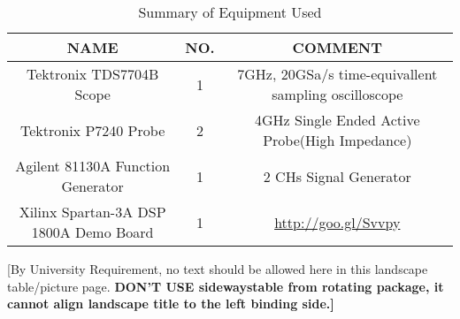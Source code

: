 \begin{landscape}
\begin{table}[htbp]


 \label{table:B.1}
 
 \caption{Summary of Equipment Used}
 
\begin{tabular}{|c|c|c|}
\hline
\textbf{NAME} & \textbf{NO}. & \textbf{COMMENT}\\
\hline
Tektronix TDS7704B Scope & 1 & 7GHz, 20GSa/s time-equivallent sampling oscilloscope\\
\hline
Tektronix P7240 Probe & 2 & 4GHz Single Ended Active Probe(High Impedance)\\
\hline
Agilent 81130A Function Generator & 1 & 2 CHs Signal Generator \\
\hline
Xilinx Spartan-3A DSP 1800A Demo Board & 1 & \url{http://goo.gl/Svvpy}\\
\hline

\end{tabular}
\begin{tablenotes} 
\small 
\item
\relax
[By University Requirement, no text should be allowed here in this landscape table/picture page. \textbf{DON'T USE sidewaystable from rotating package, it cannot align landscape title to the left binding side.]} 
\end{tablenotes}
\end{table}
\end{landscape}


